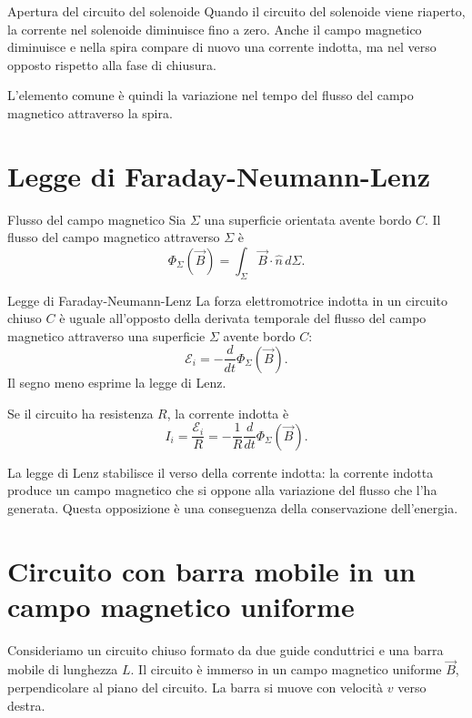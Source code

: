 \documentclass[a4paper]{article}
\begin{document}
\begin{snippetexample}{Apertura del circuito del solenoide}
Quando il circuito del solenoide viene riaperto, la corrente nel solenoide diminuisce fino a zero. Anche il campo magnetico diminuisce e nella spira compare di nuovo una corrente indotta, ma nel verso opposto rispetto alla fase di chiusura.
\end{snippetexample}

L'elemento comune è quindi la variazione nel tempo del flusso del campo magnetico attraverso la spira.

\section{Legge di Faraday-Neumann-Lenz}

\begin{snippetdefinition}{Flusso del campo magnetico}
Sia \(\Sigma\) una superficie orientata avente bordo \(C\). Il flusso del campo magnetico attraverso \(\Sigma\) è
\[
    \Phi_\Sigma(\vec{B})=\int_\Sigma \vec{B}\cdot\hat{n}\,d\Sigma.
\]
\end{snippetdefinition}

\begin{snippettheorem}{Legge di Faraday-Neumann-Lenz}
La forza elettromotrice indotta in un circuito chiuso \(C\) è uguale all'opposto della derivata temporale del flusso del campo magnetico attraverso una superficie \(\Sigma\) avente bordo \(C\):
\[
    \mathcal{E}_i=-\frac{d}{dt}\Phi_\Sigma(\vec{B}).
\]
Il segno meno esprime la legge di Lenz.
\end{snippettheorem}

Se il circuito ha resistenza \(R\), la corrente indotta è
\[
I_i=\frac{\mathcal{E}_i}{R}
=-\frac{1}{R}\frac{d}{dt}\Phi_\Sigma(\vec{B}).
\]

La legge di Lenz stabilisce il verso della corrente indotta: la corrente indotta produce un campo magnetico che si oppone alla variazione del flusso che l'ha generata. Questa opposizione è una conseguenza della conservazione dell'energia.

\section{Circuito con barra mobile in un campo magnetico uniforme}

Consideriamo un circuito chiuso formato da due guide conduttrici e una barra mobile di lunghezza \(L\). Il circuito è immerso in un campo magnetico uniforme \(\vec{B}\), perpendicolare al piano del circuito. La barra si muove con velocità \(v\) verso destra.
\end{document}
